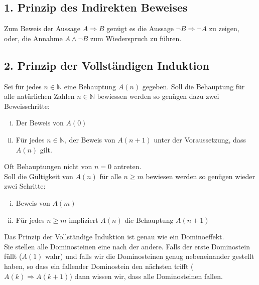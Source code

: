  \subsection*{1. Prinzip des Indirekten Beweises}
Zum Beweis der Aussage $A\Rightarrow B$ genügt es die Aussage $\lnot B\Rightarrow\lnot A$ zu zeigen, oder, die Annahme $A\land\lnot B$ zum Wiederspruch zu führen.
\subsection*{2. Prinzip der Vollständigen Induktion}
Sei für jedes $n\in\mathbb{N}$ eine Behauptung $A(n)$ gegeben. Soll die Behauptung für alle natürlichen Zahlen $n\in\mathbb{N}$ bewiessen werden so genügen dazu zwei Beweisschritte:
\begin{enumerate}[i)]
\item Der Beweis von $A(0)$
\item Für jedes $n\in\mathbb{N}$, der Beweis von $A(n+1)$ unter der Voraussetzung, dass $A(n)$ gilt. 
\end{enumerate}
Oft Behauptungen nicht von $n=0$ antreten. \\
Soll die Gültigkeit von $A(n)$ für alle $n\geq m$ bewiesen werden so genügen wieder zwei Schritte:
\begin{enumerate}[i)]
	\item Beweis von $A(m)$
	\item Für jedes $n\geq m$ impliziert $A(n)$ die Behauptung $A(n+1)$
\end{enumerate}
Das Prinzip der Vollständige Induktion ist genau wie ein Dominoeffekt.\\

Sie stellen alle Dominosteinen eine nach der andere. Falls der erste Dominostein füllt ($A(1)$ wahr) und falls wir die Dominosteinen genug nebeneinander gestellt haben, so dass ein fallender Dominostein den nächsten trifft ($A(k)\Rightarrow A(k+1)$) dann wissen wir, dass alle Dominosteinen fallen. 

